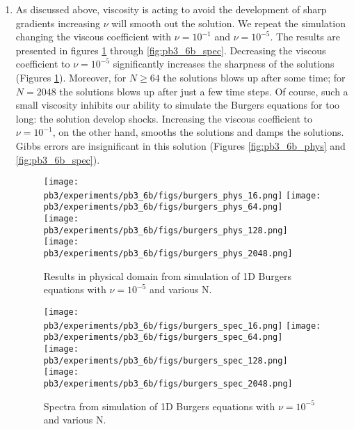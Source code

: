 \documentclass[11pt]{article}
\begin{document}
\begin{enumerate}
\item As discussed above, viscosity is acting to avoid the development of sharp gradients increasing $\nu$ will smooth out the solution. We repeat the simulation changing the viscous coefficient with  $\nu=10^{-1}$ and $\nu=10^{-5}$. The results are presented in figures \ref{fig:pb3_6a_phys} through \ref{fig:pb3_6b_spec}. Decreasing the viscous coefficient to $\nu = 10^{-5}$ significantly increases the sharpness of the solutions (Figures \ref{fig:pb3_6a_phys}). Moreover, for $N\ge 64$ the solutions blows up after some time; for $N=2048$ the solutions blows up after just a few time steps. Of course, such a small viscosity inhibits our ability to simulate the Burgers equations for too long: the solution develop shocks. Increasing the viscous coefficient to $\nu = 10^{-1}$, on the other hand, smooths the solutions and damps the solutions. Gibbs errors are insignificant in this solution (Figures \ref{fig:pb3_6b_phys} and \ref{fig:pb3_6b_spec}). 

    \begin{figure}[ht]
    \begin{center}
    \texttt{[image: pb3/experiments/pb3\_6b/figs/burgers\_phys\_16.png]} 
    \texttt{[image: pb3/experiments/pb3\_6b/figs/burgers\_phys\_64.png]}\\
    \texttt{[image: pb3/experiments/pb3\_6b/figs/burgers\_phys\_128.png]}
    \texttt{[image: pb3/experiments/pb3\_6b/figs/burgers\_phys\_2048.png]}
    \end{center}
    \caption{Results in physical domain from simulation of 1D Burgers equations with $\nu = 10^{-5}$ and various N.}
    \label{fig:pb3_6a_phys}
    \end{figure}


    \begin{figure}[ht]
    \begin{center}
    \texttt{[image: pb3/experiments/pb3\_6b/figs/burgers\_spec\_16.png]} 
    \texttt{[image: pb3/experiments/pb3\_6b/figs/burgers\_spec\_64.png]}\\
    \texttt{[image: pb3/experiments/pb3\_6b/figs/burgers\_spec\_128.png]}
    \texttt{[image: pb3/experiments/pb3\_6b/figs/burgers\_spec\_2048.png]}
    \end{center}
    \caption{Spectra from simulation of 1D Burgers equations with $\nu = 10^{-5}$ and various N.}
    \label{fig:pb3_6a_spec}
    \end{figure}



\end{enumerate}
\end{document}
